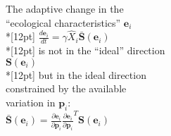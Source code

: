\documentclass{article}
\begin{document}
\noindent
The adaptive change in the\\
``ecological characteristics'' $\mathbf{e}_i$
\\*[12pt]
\indent
\(
 \frac{d\mathbf{e}_i}{dt} = \gamma \hat{X}_i \bar{\mathbf{S}}(\mathbf{e}_i)
\)
\\*[12pt]
\noindent
is not in the ``ideal'' direction
\\[12pt]
\indent
\( \mathbf{S}(\mathbf{e}_i) \)
\\*[12pt]
\noindent
but in the ideal direction\\
constrained by the available\\
variation in $\mathbf{p}_i$:
\\[12pt]
\indent
\( \bar{\mathbf{S}}(\mathbf{e}_i) = \frac{\partial\mathbf{e}_i}{\partial\mathbf{p}_i}\frac{\partial\mathbf{e}_i}{\partial\mathbf{p}_i}^T \mathbf{S}(\mathbf{e}_i) \)
\end{document}
